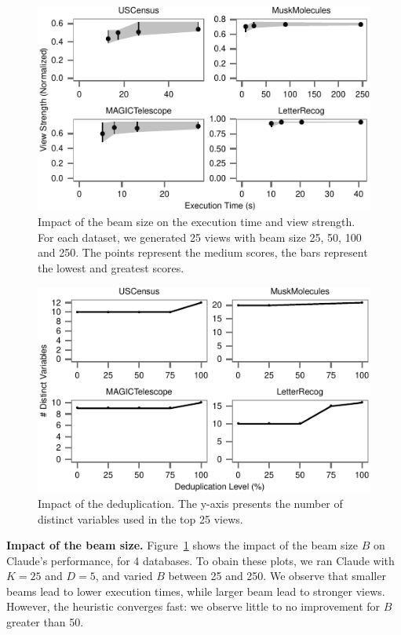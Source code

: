 \begin{figure}[t!]
\centering
\includegraphics[width=\columnwidth]{plots/view-vary-beam}
\caption{Impact of the beam size on the execution time and view strength. For
each dataset, we generated 25 views with beam size 25, 50, 100 and 250. The
points represent the medium scores, the bars represent the lowest and greatest
scores.}
\label{pic:view-beam}
\end{figure}
\begin{figure}[t!]
\centering
\includegraphics[width=\columnwidth]{plots/view-vary-diversification}
\caption{Impact of the deduplication. The y-axis presents the number of
distinct variables used in the top 25 views.}
\label{pic:view-diversification}
\end{figure}
\textbf{Impact of the beam size.} Figure~\ref{pic:view-beam} shows the impact
of the beam size $B$ on Claude's performance, for 4 databases. To obain these
plots, we ran Claude with $K=25$ and $D=5$, and varied $B$ between 25 and 250.
We observe that smaller beams lead to lower execution times, while larger beam
lead to stronger views. However, the heuristic converges fast: we observe
little to no improvement for $B$ greater than 50.

